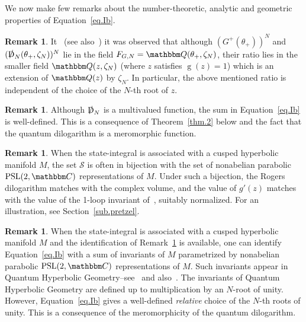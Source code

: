 \documentclass[12pt]{amsart}
\theoremstyle{definition}
\newtheorem{remark}[theorem]{Remark}
\def\BQ{\mathbbm Q}
\def\BC{\mathbbm C}
\def\PSL{\mathrm{PSL}}
\def\th{\theta}
\def\calS{\mathcal{S}}
\begin{document}
We now make few remarks about the number-theoretic, analytic and geometric properties of 
Equation~\eqref{eq.Ib}. 

\begin{remark}
\label{rem.algebraic}
It~\cite{GZ1} (see also~\cite{DG2}) it was observed that although 
$(G^+(\th_+))^N$ and $(\slashed{\operatorname{D}}_N(\th_+,\zeta_N))^N$ 
lie in the field $F_{G,N}=\BQ(\th_+,\zeta_N)$, their ratio lies in the 
smaller field $\BQ(z,\zeta_N)$ (where $z$
satisfies $\operatorname{g}(z)=1$) which is an extension of $\BQ(z)$  
by $\zeta_N$. In particular, the above
mentioned ratio is independent of the choice of the $N$-th root of $z$. 
\end{remark}

\begin{remark}
\label{rem.multivalued}
Although $\slashed{\operatorname{D}}_N$ is a multivalued function, the
sum in Equation~\eqref{eq.Ib} is well-defined. This is a consequence
of Theorem~\ref{thm.2} below and the fact that the quantum dilogarithm is 
a meromorphic function.
\end{remark}

\begin{remark}
\label{rem.parabolic}
When the state-integral is associated with a cusped hyperbolic manifold $M$, 
the set $\calS$ is often in bijection with the set of nonabelian parabolic 
$\PSL(2,\BC)$ representations of $M$. Under such a bijection, the Rogers
dilogarithm matches with the complex volume, and the value of $g'(z)$ matches
with the value of the 1-loop invariant of~\cite{DG}, suitably normalized.
For an illustration, see Section~\ref{sub.pretzel}.
\end{remark}

\begin{remark}
\label{rem.QHG}
When the state-integral is associated with a cusped hyperbolic manifold $M$
and the identification of Remark~\ref{rem.parabolic} is available,
one can identify Equation~\eqref{eq.Ib} with a sum of invariants of $M$
parametrized by nonabelian parabolic $\PSL(2,\BC)$ representations of $M$.
Such invariants appear in Quantum Hyperbolic Geometry--see~\cite{K97} and
also~\cite{BB}. The invariants of Quantum Hyperbolic Geometry are defined 
up to multiplication by an $N$-root of unity. However, Equation~\eqref{eq.Ib}
gives a well-defined {\em relative} choice of the $N$-th roots of unity.
This is a consequence of the meromorphicity of the quantum dilogarithm. 
\end{remark}
\end{document}
